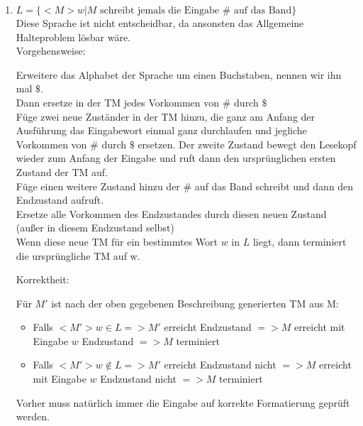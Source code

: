 \documentclass[a4paper,11pt]{scrartcl}
\begin{document}
\begin{enumerate}[label=\alph*)]
	\item	$L = \{<M>w \vert M \text{ schreibt jemals die Eingabe } \# \text{ auf das Band}\}$\\
			Diese Sprache ist nicht entscheidbar, da ansonsten das Allgemeine Halteproblem lösbar wäre.\\
			Vorgehensweise:
			\begin{center}
			Erweitere das Alphabet der Sprache um einen Buchstaben, nennen wir ihn mal $\$$.\\
			Dann ersetze in der TM jedes Vorkommen von $\#$ durch $\$$\\
			Füge zwei neue Zuständer in der TM hinzu, die ganz am Anfang der Ausführung das Eingabewort einmal ganz durchlaufen und jegliche Vorkommen von $\#$ durch $\$$ ersetzen. Der zweite Zustand bewegt den Lesekopf wieder zum Anfang der Eingabe und ruft dann den ursprünglichen ersten Zustand der TM auf.\\
			Füge einen weitere Zustand hinzu der $\#$ auf das Band schreibt und dann den Endzustand aufruft.\\
			Ersetze alle Vorkommen des Endzustandes durch diesen neuen Zustand (außer in diesem Endzustand selbst)\\
			Wenn diese neue TM für ein bestimmtes Wort $w$ in $L$ liegt, dann terminiert die ursprüngliche TM auf w.
			\end{center}
			Korrektheit:
			\begin{center}
			Für $M'$ ist nach der oben gegebenen Beschreibung generierten TM aus M:
			\end{center}
			\begin{itemize}
			\item Falls $<M'>w \in L => M'$ erreicht Endzustand $=> M$ erreicht mit Eingabe $w$ Endzustand $=> M$ terminiert
			\item Falls $<M'>w \not\in L => M'$ erreicht Endzustand nicht $=> M$ erreicht mit Eingabe $w$ Endzustand nicht $=> M$ terminiert
			\end{itemize}
			Vorher muss natürlich immer die Eingabe auf korrekte Formatierung geprüft werden.	
		

\end{enumerate}
\end{document}
